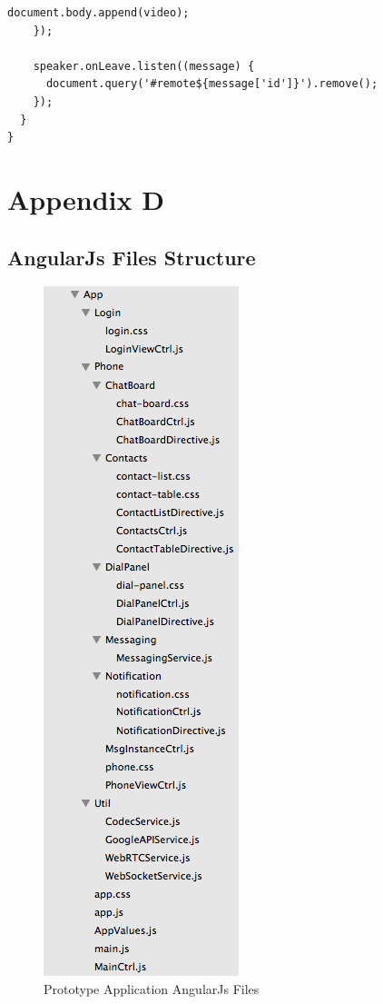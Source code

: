 \begin{appendices}
\begin{lstlisting}[caption={WebRTCCtrl in Dart application client},label={code:dart_webrtcctrl}]
      document.body.append(video);
    });

    speaker.onLeave.listen((message) {
      document.query('#remote${message['id']}').remove();
    });
  }
}
\end{lstlisting}

\chapter{Appendix D}

\section{AngularJs Files Structure} 
\label{code:angularjs_structure}

\begin{figure}
	\centering
    	\includegraphics[height=0.45\textheight,natwidth=610,natheight=642]{figs/angularjs_structure.png}
  	\caption{Prototype Application AngularJs Files}
  	\label{fig:angularjs_structure}
\end{figure}

\end{appendices}